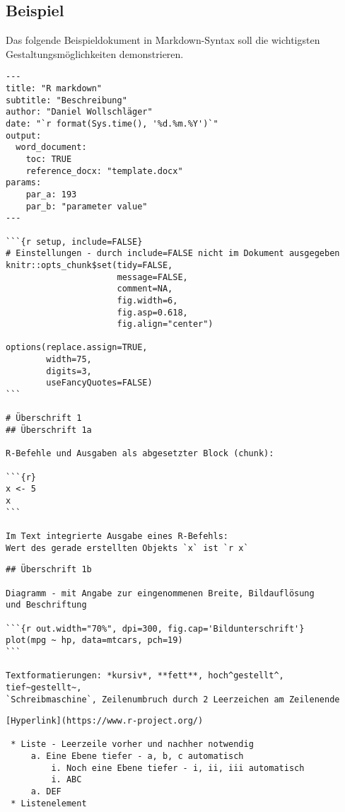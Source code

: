 \subsection{Beispiel}

Das folgende Beispieldokument in Markdown-Syntax soll die wichtigsten Gestaltungsmöglichkeiten demonstrieren.
\begin{lstlisting}
---
title: "R markdown"
subtitle: "Beschreibung"
author: "Daniel Wollschläger"
date: "`r format(Sys.time(), '%d.%m.%Y')`"
output:
  word_document:
    toc: TRUE
    reference_docx: "template.docx"
params:
    par_a: 193
    par_b: "parameter value"
---

```{r setup, include=FALSE}
# Einstellungen - durch include=FALSE nicht im Dokument ausgegeben
knitr::opts_chunk$set(tidy=FALSE,
                      message=FALSE,
                      comment=NA,
                      fig.width=6,
                      fig.asp=0.618,
                      fig.align="center")

options(replace.assign=TRUE,
        width=75,
        digits=3,
        useFancyQuotes=FALSE)
```

# Überschrift 1
## Überschrift 1a

R-Befehle und Ausgaben als abgesetzter Block (chunk):

```{r}
x <- 5
x
```

Im Text integrierte Ausgabe eines R-Befehls:
Wert des gerade erstellten Objekts `x` ist `r x`
\end{lstlisting}

\begin{lstlisting}
## Überschrift 1b

Diagramm - mit Angabe zur eingenommenen Breite, Bildauflösung
und Beschriftung

```{r out.width="70%", dpi=300, fig.cap='Bildunterschrift'}
plot(mpg ~ hp, data=mtcars, pch=19)
```

Textformatierungen: *kursiv*, **fett**, hoch^gestellt^, tief~gestellt~,  
`Schreibmaschine`, Zeilenumbruch durch 2 Leerzeichen am Zeilenende
\end{lstlisting}

\begin{lstlisting}
[Hyperlink](https://www.r-project.org/)

 * Liste - Leerzeile vorher und nachher notwendig
     a. Eine Ebene tiefer - a, b, c automatisch
         i. Noch eine Ebene tiefer - i, ii, iii automatisch
         i. ABC
     a. DEF
 * Listenelement
\end{lstlisting}

